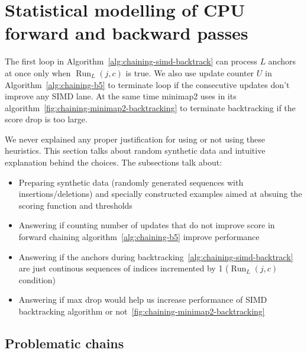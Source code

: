 \section{Statistical modelling of CPU forward and backward passes}
\label{sec:chaining-runl-repeat-experiment}
\label{sec:chaining-cpu-experimental-analysis}

The first loop in Algorithm~\ref{alg:chaining-simd-backtrack} can process
\(L\) anchors at once only when \(\operatorname{Run}_L(j,c)\) is true. 
We also use update counter $U$ in Algorithm~\ref{alg:chaining-b5} to terminate loop if the consecutive updates don't improve any SIMD lane.
At the same time minimap2 uses  in its algorithm~\ref{fig:chaining-minimap2-backtracking} to terminate backtracking if the score drop is too large.

We never explained any proper justification for using or not using these heuristics. This section talks about random synthetic data and intuitive explanation behind the choices.
The subsections talk about:
\begin{itemize}
  \item Preparing synthetic data (randomly generated sequences with insertions/deletions) and specially constructed examples aimed at absuing the scoring function and thresholds
  \item Answering if counting number of updates that do not improve score in forward chaining algorithm~\ref{alg:chaining-b5} improve performance
  \item Answering if the anchors during backtracking~\ref{alg:chaining-simd-backtrack} are just continous sequences of indices incremented by 1 (\(\operatorname{Run}_L(j,c)\) condition)
  \item Answering if max drop would help us increase performance of SIMD backtracking algorithm or not~\ref{fig:chaining-minimap2-backtracking}
\end{itemize}


\subsection{Problematic chains}


